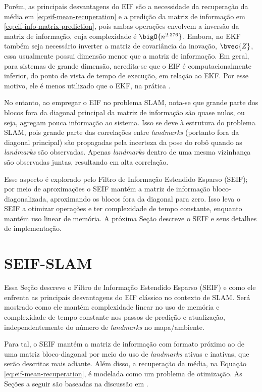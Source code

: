 Porém, as principais desvantagens do EIF são a necessidade da recuperação da média em \ref{eq:eif-mean-recuperation} e a predição da matriz de informação em 
\ref{eq:eif-info-matrix-prediction}, pois ambas operações envolvem a inversão 
da matriz de informação, cuja complexidade é $\bigO{n^{2.376}}$. Embora, no EKF 
também seja 
necessário inverter a matriz de covariância da inovação, $\bvec{Z}$, 
essa usualmente possui dimensão menor que a matriz de informação. 
Em geral, para sistemas de grande dimensão, acredita-se que o EIF é 
computacionalmente inferior, do ponto de vista de tempo de execução, em relação 
ao EKF. Por esse motivo, ele é menos utilizado que o EKF, na prática 
\cite[p.~78]{thrun2005probabilistic}.

No entanto, ao empregar o EIF no problema SLAM, nota-se que grande parte dos 
blocos fora da diagonal principal da matriz de informação são quase nulos, ou 
seja, agregam pouca informação ao sistema. Isso se deve à estrutura do problema 
SLAM, pois grande parte das correlações entre \textit{landmarks} (portanto 
fora da diagonal principal) são propagadas pela incerteza da pose do robô 
quando as \textit{landmarks} são observadas. Apenas 
\textit{landmarks} dentro de uma mesma vizinhança são observadas juntas, 
resultando em alta correlação.

Esse aspecto é explorado pelo Filtro de Informação Estendido Esparso (SEIF); 
por meio de aproximações o SEIF mantém a matriz de informação bloco-diagonalizada, 
aproximando os blocos fora da diagonal para zero. Isso leva o SEIF a otimizar 
operações e ter complexidade de tempo constante, enquanto mantém uso linear de 
memória. A próxima Seção descreve o SEIF e seus detalhes de implementação.

\section{SEIF-SLAM}
Essa Seção descreve o Filtro de Informação Estendido Esparso (SEIF) e 
como ele enfrenta as principais desvantagens do EIF clássico no 
contexto de SLAM. Será mostrado como ele mantém complexidade 
linear no uso de memória e complexidade de tempo constante nos passos de predição e atualização, independentemente do número de 
\textit{landmarks} no mapa/ambiente.

Para tal, o SEIF mantém a matriz de informação 
com formato próximo ao de uma matriz bloco-diagonal por meio do uso de 
\textit{landmarks} ativas e inativas, que serão descritas mais adiante. 
Além disso, a recuperação da média, na Equação 
\ref{eq:eif-mean-recuperation}, é modelada como um problema de 
otimização. As Seções a seguir são baseadas na discussão em \cite[Capítulo~12.4]{thrun2005probabilistic}.

